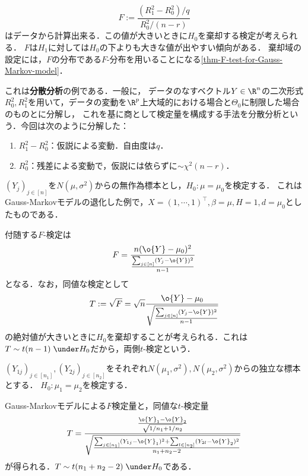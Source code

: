 \documentclass[uplatex,dvipdfmx]{jsreport}
\begin{document}
\begin{test}[$F$-検定]
    \[F:=\frac{(R^2_1-R^2_0)/q}{R^2_0/(n-r)}\]
    はデータから計算出来る．この値が大きいときに$H_0$を棄却する検定が考えられる．
    $F$は$H_1$に対しては$H_0$の下よりも大きな値が出やすい傾向がある．
    棄却域の設定には，$F$の分布である$F$-分布を用いることになる\ref{thm-F-test-for-Gauss-Markov-model}．
\end{test}
\begin{remarks}
    これは\textbf{分散分析}の例である．一般に，
    データのなすベクトル$Y\in\R^n$の二次形式$R_0^2,R_1^2$を用いて，データの変動を$\R^p$上大域的における場合と$\Theta_0$に制限した場合のものとに分解し，
    これを基に商として検定量を構成する手法を分散分析という．今回は次のように分解した：
    \begin{enumerate}
        \item $R^2_1-R^2_0$：仮説による変動．自由度は$q$．
        \item $R^2_0$：残差による変動で，仮説には依らずに$\sim\chi^2(n-r)$．
    \end{enumerate}
\end{remarks}

\begin{problem}
    $(Y_j)_{j\in[n]}$を$N(\mu,\sigma^2)$からの無作為標本とし，$H_0:\mu=\mu_0$を検定する．
    これはGauss-Markovモデルの退化した例で，$X=(1,\cdots,1)^\top,\beta=\mu,H=1,d=\mu_0$としたものである．
\end{problem}

\begin{test}[両側$t$-検定]\label{test-two-sided-t-test}
    付随する$F$-検定は
    \[F=\frac{n(\o{Y}-\mu_0)^2}{\frac{\sum_{j\in[n]}(Y_j-\o{Y})^2}{n-1}}\]
    となる．なお，同値な検定として
    \[T:=\sqrt{F}=\sqrt{n}\frac{\o{Y}-\mu_0}{\sqrt{\frac{\sum_{j\in[n]}(Y_j-\o{Y})^2}{n-1}}}\]
    の絶対値が大きいときに$H_0$を棄却することが考えられる．これは$T\sim t(n-1)\;\under H_0$だから，両側$t$-検定という．
\end{test}

\begin{problem}
    $(Y_{1j})_{j\in[n_1]},(Y_{2j})_{j\in[n_2]}$をそれぞれ$N(\mu_1,\sigma^2),N(\mu_2,\sigma^2)$からの独立な標本とする．
    $H_0:\mu_1=\mu_2$を検定する．
\end{problem}

\begin{test}
    Gauss-Markovモデルによる$F$検定量と，同値な$t$-検定量
    \[T=\frac{\frac{\o{Y}_1-\o{Y}_2}{\sqrt{1/n_1+1/n_2}}}{\sqrt{\frac{\sum_{j\in[n_1]}(Y_{1j}-\o{Y}_1)^2+\sum_{l\in[n_2]}(Y_{2l}-\o{Y}_2)^2}{n_1+n_2-2}}}\]
    が得られる．$T\sim t(n_1+n_2-2)\;\under H_0$である．
\end{test}
\end{document}
